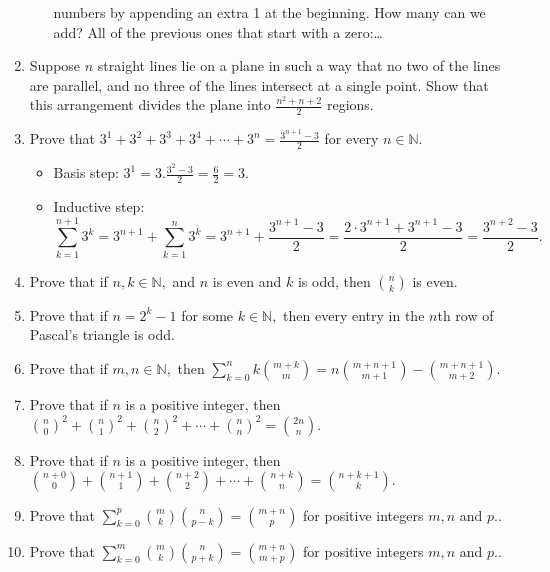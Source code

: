 \documentclass[11pt, oneside]{amsart}
\begin{document}
\begin{enumerate}
\begin{itemize}
numbers by appending an extra 1 at the beginning.  How many can we add?  All of the previous ones that start with
a zero:\ldots{}
\end{itemize}
\item Suppose \(n\) straight lines lie on a plane in such a way that no two of the lines are parallel, and no three of the lines intersect at a single point.  Show that this arrangement divides the plane into \(\frac{n^2+n+2}{2}\) regions.
\label{sec:org4517067}
\item Prove that \(3^1 + 3^2 + 3^3 + 3^4 + \dotsb + 3^n = \frac{3^{n+1}-3}{2}\) for every \(n \in \mathbb{N}.\)
\label{sec:org51e706c}
\begin{itemize}
\item Basis step: \(3^1 = 3. \tfrac{3^2-3}{2}=\tfrac{6}{2}=3.\)
\item Inductive step:
\begin{equation*}
\sum_{k=1}^{n+1} 3^k = 3^{n+1} + \sum_{k=1}^n 3^k = 3^{n+1} + \frac{3^{n+1}-3}{2} = \frac{2\cdot 3^{n+1} +
3^{n+1} - 3}{2} = \frac{3^{n+2}-3}{2}.
\end{equation*}
\end{itemize}
\item Prove that if \(n,k \in \mathbb{N},\) and \(n\) is even and \(k\) is odd, then \(\binom{n}{k}\) is even.
\label{sec:orgbc60f72}
\item Prove that if \(n = 2^k-1\) for some \(k \in \mathbb{N},\) then every entry in the \(n\)th row of Pascal's triangle is odd.
\label{sec:org4e024f3}
\item Prove that if \(m,n \in \mathbb{N},\) then \(\sum_{k=0}^n k \binom{m+k}{m} = n \binom{m+n+1}{m+1} - \binom{m+n+1}{m+2}.\)
\label{sec:org6fa626b}
\item Prove that if \(n\) is a positive integer, then \(\binom{n}{0}^2 + \binom{n}{1}^2 + \binom{n}{2}^2 + \dotsb + \binom{n}{n}^2 = \binom{2n}{n}.\)
\label{sec:org2275f0f}
\item Prove that if \(n\) is a positive integer, then \(\binom{n+0}{0} + \binom{n+1}{1} + \binom{n+2}{2} + \dotsb + \binom{n+k}{n} = \binom{n+k+1}{k}.\)
\label{sec:org481d295}
\item Prove that \(\sum_{k=0}^p \binom{m}{k} \binom{n}{p-k} = \binom{m+n}{p}\) for positive integers \(m, n\) and \(p.\).
\label{sec:org6b356f8}
\item Prove that \(\sum_{k=0}^m \binom{m}{k} \binom{n}{p+k} = \binom{m+n}{m+p}\) for positive integers \(m, n\) and \(p.\).
\label{sec:orgf932909}
\end{enumerate}
\end{document}
